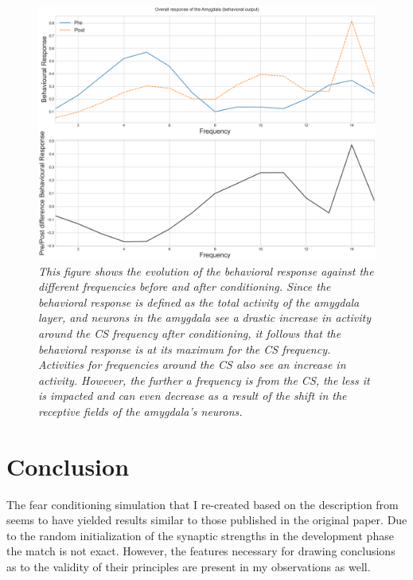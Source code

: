 \begin{figure}[!htbp]
   \begin{center}
      \includegraphics[width=\textwidth]{Figs/behavioral_response}
      \caption{\textit{This figure shows the evolution of the behavioral response against the different frequencies before and after conditioning. Since the behavioral response is defined as the total activity of the amygdala layer, and neurons in the amygdala see a drastic increase in activity around the CS frequency after conditioning, it follows that the behavioral response is at its maximum for the CS frequency. Activities for frequencies around the CS also see an increase in activity. However, the further a frequency is from the CS, the less it is impacted and can even decrease as a result of the shift in the receptive fields of the amygdala's neurons.}}\label{fig:armony_behav_resp}
   \end{center}
\end{figure}

\section{Conclusion}
\iffalse%
The fear conditioning simulation that I re-created based on the description from~\citet{Armony1995} seems to have yielded results similar to those published in the original paper. Due to the random initialization of the synaptic strengths in the development phase the match is not exact. However, the features necessary for drawing conclusions as to the validity of their principles are present in my observations as well.\\

